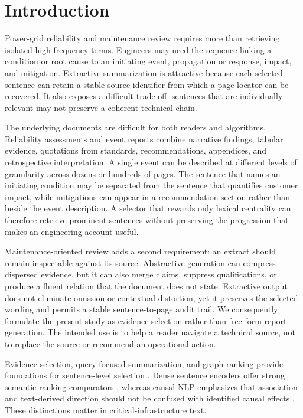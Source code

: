 \documentclass[applsci,article,submit,moreauthors]{Definitions/mdpi}
\begin{document}
\section{Introduction}

Power-grid reliability and maintenance review requires more than retrieving isolated high-frequency terms. Engineers may need the sequence linking a condition or root cause to an initiating event, propagation or response, impact, and mitigation. Extractive summarization is attractive because each selected sentence can retain a stable source identifier from which a page locator can be recovered. It also exposes a difficult trade-off: sentences that are individually relevant may not preserve a coherent technical chain.

The underlying documents are difficult for both readers and algorithms. Reliability assessments and event reports combine narrative findings, tabular evidence, quotations from standards, recommendations, appendices, and retrospective interpretation. A single event can be described at different levels of granularity across dozens or hundreds of pages. The sentence that names an initiating condition may be separated from the sentence that quantifies customer impact, while mitigations can appear in a recommendation section rather than beside the event description. A selector that rewards only lexical centrality can therefore retrieve prominent sentences without preserving the progression that makes an engineering account useful.

Maintenance-oriented review adds a second requirement: an extract should remain inspectable against its source. Abstractive generation can compress dispersed evidence, but it can also merge claims, suppress qualifications, or produce a fluent relation that the document does not state. Extractive output does not eliminate omission or contextual distortion, yet it preserves the selected wording and permits a stable sentence-to-page audit trail. We consequently formulate the present study as evidence selection rather than free-form report generation. The intended use is to help a reader navigate a technical source, not to replace the source or recommend an operational action.

Evidence selection, query-focused summarization, and graph ranking provide foundations for sentence-level selection \cite{thorne2018fever,zhong2021qmsum,vig2022exploring,wang2020heterogeneous}. Dense sentence encoders offer strong semantic ranking comparators \cite{reimers2019sentencebert}, whereas causal NLP emphasizes that association and text-derived direction should not be confused with identified causal effects \cite{feder2022causal,du2022ecare}. These distinctions matter in critical-infrastructure text.
\end{document}
